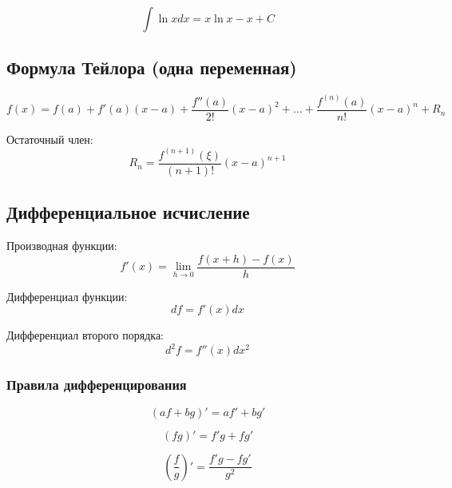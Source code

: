 \documentclass[a4paper,12pt]{article}
\begin{document}
\begin{equation}
\int \ln x  dx = x \ln x - x + C
\end{equation}

\subsection{Формула Тейлора (одна переменная)}
\setcounter{equation}{0}

\begin{equation}
f(x) = f(a) + f'(a)(x-a) + \frac{f''(a)}{2!}(x-a)^2 + \dots + \frac{f^{(n)}(a)}{n!}(x-a)^n + R_n
\end{equation}

Остаточный член:
\begin{equation}
R_n = \frac{f^{(n+1)}(\xi)}{(n+1)!}(x-a)^{n+1}
\end{equation}

\subsection{Дифференциальное исчисление}
\setcounter{equation}{0}

Производная функции:
\begin{equation}
f'(x) = \lim_{h \to 0} \frac{f(x+h) - f(x)}{h}
\end{equation}

Дифференциал функции:
\begin{equation}
df = f'(x)dx
\end{equation}

Дифференциал второго порядка:
\begin{equation}
d^2 f = f''(x)dx^2
\end{equation}

\subsubsection{Правила дифференцирования}
\setcounter{equation}{0}

\begin{equation}
(af + bg)' = af' + bg'
\end{equation}

\begin{equation}
(fg)' = f'g + fg'
\end{equation}

\begin{equation}
\left(\frac{f}{g}\right)' = \frac{f'g - fg'}{g^2}
\end{equation}
\end{document}
